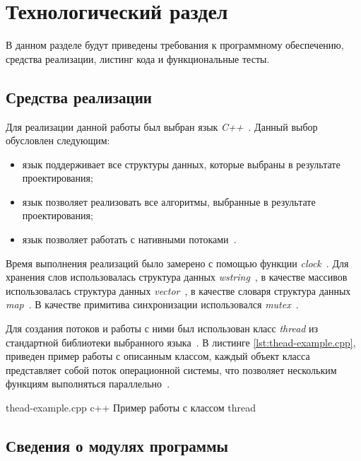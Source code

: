 \chapter{Технологический раздел}

В данном разделе будут приведены требования к программному обеспечению, средства реализации, листинг кода и функциональные тесты.


\section{Средства реализации}

Для реализации данной работы был выбран язык \textit{C++}~\cite{cpp}.
Данный выбор обусловлен следующим:
\begin{itemize}
	\item язык поддерживает все структуры данных, которые выбраны в результате проектирования;
	\item язык позволяет реализовать все алгоритмы, выбранные в результате проектирования;
	\item язык позволяет работать с нативными потоками~\cite{thread}. 
\end{itemize}

Время выполнения реализаций было замерено с помощью функции \textit{clock}~\cite{clock}. 
Для хранения слов использовалась структура данных \textit{wstring}~\cite{wstring}, в качестве массивов использовалась структура данных \textit{vector}~\cite{vector}, в качестве словаря структура данных \textit{map}~\cite{map}.
В качестве примитива синхронизации использовался \textit{mutex}~\cite{mutex}.

Для создания потоков и работы с ними был использован класс \textit{thread} из стандартной библиотеки выбранного языка~\cite{thread}.
В листинге \ref{lst:thead-example.cpp}, приведен пример работы с описанным классом, каждый объект класса представляет собой поток операционной системы, что позволяет нескольким функциям выполняться параллельно~\cite{thread}. 

\clearpage
{}
{thead-example.cpp} %
{c++} %
{Пример работы с классом thread} %



\section{Сведения о модулях программы}

